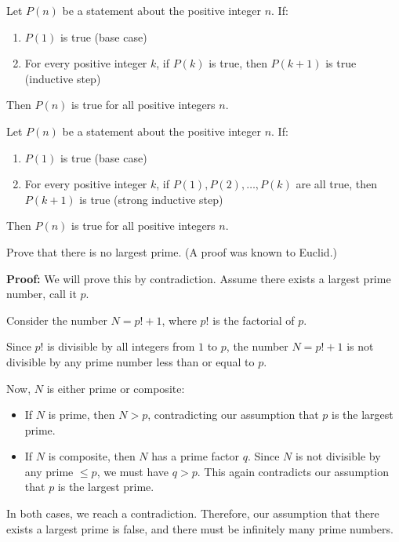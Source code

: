 \begin{theorem}
Let $P(n)$ be a statement about the positive integer $n$. If:
\begin{enumerate}
\item $P(1)$ is true (base case)
\item For every positive integer $k$, if $P(k)$ is true, then $P(k+1)$ is true (inductive step)
\end{enumerate}
Then $P(n)$ is true for all positive integers $n$.
\end{theorem}

\begin{theorem}
Let $P(n)$ be a statement about the positive integer $n$. If:
\begin{enumerate}
\item $P(1)$ is true (base case)
\item For every positive integer $k$, if $P(1), P(2), \ldots, P(k)$ are all true, then $P(k+1)$ is true (strong inductive step)
\end{enumerate}
Then $P(n)$ is true for all positive integers $n$.
\end{theorem}

\begin{problembox}
Prove that there is no largest prime. (A proof was known to Euclid.)
\end{problembox}

\textbf{Proof:}
We will prove this by contradiction. Assume there exists a largest prime number, call it $p$.

Consider the number $N = p! + 1$, where $p!$ is the factorial of $p$. 

Since $p!$ is divisible by all integers from $1$ to $p$, the number $N = p! + 1$ is not divisible by any prime number less than or equal to $p$.

Now, $N$ is either prime or composite:
\begin{itemize}
\item If $N$ is prime, then $N > p$, contradicting our assumption that $p$ is the largest prime.
\item If $N$ is composite, then $N$ has a prime factor $q$. Since $N$ is not divisible by any prime $\leq p$, we must have $q > p$. This again contradicts our assumption that $p$ is the largest prime.
\end{itemize}

In both cases, we reach a contradiction. Therefore, our assumption that there exists a largest prime is false, and there must be infinitely many prime numbers.

